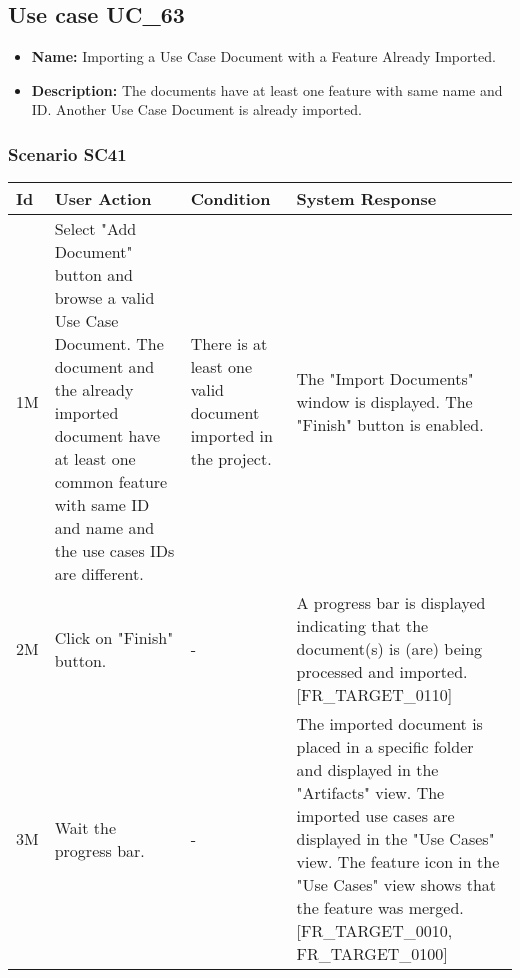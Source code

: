 \documentclass[a4paper,11pt]{article}
\newcommand{\bl}{\\ \hline}
\begin{document}
\subsection*{Use case UC_63}
\begin{itemize}
\item {\bf Name: }Importing a Use Case Document with a Feature Already Imported.
			
\item {\bf Description: }The documents have at least one feature with same name
				and ID. Another Use Case Document is already imported.
\end{itemize}
\subsubsection*{Scenario SC41}
\begin{tabular}{|p{0.4in}|p{1.5in}|p{1.5in}|p{1.5in}|}
\hline
Id & User Action & Condition & System Response \bl 
1M & Select "Add Document" button and browse a valid Use Case
						Document. The document and the already imported document have at
						least one common feature with same ID and name and the use cases
						IDs are different.  & There is at least one valid document imported in the
						project. & The "Import Documents" window is displayed. The "Finish"
						button is enabled.\bl
2M & Click on "Finish" button. & - & A progress bar is displayed indicating that the
						document(s) is (are) being processed and imported.
						[FR_TARGET_0110] \bl
3M & Wait the progress bar.  & - & The imported document is placed in a specific folder and
						displayed in the "Artifacts" view. The imported use cases are
						displayed in the "Use Cases" view. The feature icon in the "Use
						Cases" view shows that the feature was merged. [FR_TARGET_0010,
						FR_TARGET_0100]\bl
\end{tabular}
\end{document}
